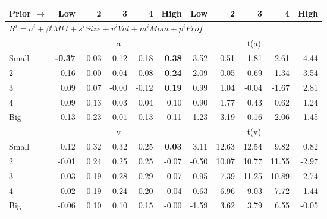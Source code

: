 
\begin{tabular}{lrrrrrrrrrr}
  \toprule
    
    Prior $\rightarrow$ & Low & 2 & 3 & 4 & High & Low & 2 & 3 & 4 & High  \\ 
  \midrule
  \multicolumn{11}{l}{$R^i=a^i+\beta^iMkt+s^iSize+v^iVal+m^iMom+p^iProf$}  \\
  
     & \multicolumn{5}{c}{a} & \multicolumn{5}{c}{t(a)}   \\
     \cmidrule(r){2-6} \cmidrule(r){7-11} 
    Small  & \textbf{-0.37}  & -0.03  & 0.12  & 0.18  & \textbf{0.38}  & -3.52  & -0.51  & 1.81  & 2.61  & 4.44   \\
    2  & -0.16  & 0.00  & 0.04  & 0.08  & \textbf{0.24}  & -2.09  & 0.05  & 0.69  & 1.34  & 3.54   \\
    3  & 0.09  & 0.07  & -0.00  & -0.12  & \textbf{0.19}  & 0.99  & 1.04  & -0.04  & -1.67  & 2.81   \\
    4  & 0.09  & 0.13  & 0.03  & 0.04  & 0.10  & 0.90  & 1.77  & 0.43  & 0.62  & 1.24   \\
    Big  & 0.13  & 0.23  & -0.01  & -0.13  & -0.11  & 1.23  & 3.19  & -0.16  & -2.06  & -1.45   \\
    
  
     & \multicolumn{5}{c}{v} & \multicolumn{5}{c}{t(v)}   \\
     \cmidrule(r){2-6} \cmidrule(r){7-11} 
    Small  & 0.12  & 0.32  & 0.32  & 0.25  & \textbf{0.03}  & 3.11  & 12.63  & 12.54  & 9.82  & 0.82   \\
    2  & -0.01  & 0.24  & 0.25  & 0.25  & -0.07  & -0.50  & 10.07  & 10.77  & 11.55  & -2.97   \\
    3  & -0.03  & 0.19  & 0.28  & 0.29  & -0.07  & -0.95  & 7.39  & 11.25  & 10.89  & -2.74   \\
    4  & 0.02  & 0.19  & 0.24  & 0.20  & -0.04  & 0.63  & 6.96  & 9.03  & 7.72  & -1.44   \\
    Big  & -0.06  & 0.10  & 0.10  & 0.15  & -0.00  & -1.59  & 3.62  & 3.79  & 6.55  & -0.05   \\
    
  
    

\end{tabular}
